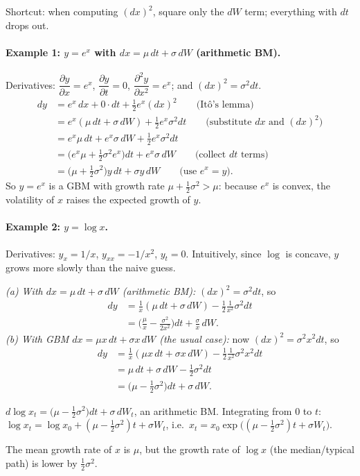 \begin{tipbox}
Shortcut: when computing $(dx)^2$, square only the $dW$ term; everything with $dt$ drops out.
\end{tipbox}

\paragraph{Example 1: $y=e^x$ with $dx=\mu\,dt+\sigma\,dW$ (arithmetic BM).}
Derivatives: $\dfrac{\partial y}{\partial x}=e^x$, $\dfrac{\partial y}{\partial t}=0$, $\dfrac{\partial^2y}{\partial x^2}=e^x$; and $(dx)^2=\sigma^2dt$.
\begin{align*}
dy&=e^x\,dx+0\cdot dt+\tfrac12e^x(dx)^2\qquad\text{(It\^o's lemma)}\\
&=e^x(\mu\,dt+\sigma\,dW)+\tfrac12e^x\sigma^2dt\qquad\text{(substitute $dx$ and $(dx)^2$)}\\
&=e^x\mu\,dt+e^x\sigma\,dW+\tfrac12e^x\sigma^2dt\\
&=\Big(e^x\mu+\tfrac12\sigma^2e^x\Big)dt+e^x\sigma\,dW\qquad\text{(collect $dt$ terms)}\\
&=\Big(\mu+\tfrac12\sigma^2\Big)y\,dt+\sigma y\,dW\qquad\text{(use $e^x=y$)}.
\end{align*}
So $y=e^x$ is a GBM with growth rate $\mu+\tfrac12\sigma^2>\mu$: because $e^x$ is convex, the volatility of $x$ raises the expected growth of $y$.

\paragraph{Example 2: $y=\log x$.} Derivatives: $y_x=1/x$, $y_{xx}=-1/x^2$, $y_t=0$. Intuitively, since $\log$ is concave, $y$ grows more slowly than the naive guess.

\emph{(a) With $dx=\mu\,dt+\sigma\,dW$ (arithmetic BM):} $(dx)^2=\sigma^2dt$, so
\begin{align*}
dy&=\frac1x(\mu\,dt+\sigma\,dW)-\frac12\frac{1}{x^2}\sigma^2dt\\
&=\Big(\frac{\mu}{x}-\frac{\sigma^2}{2x^2}\Big)dt+\frac{\sigma}{x}\,dW.
\end{align*}
\emph{(b) With GBM $dx=\mu x\,dt+\sigma x\,dW$ (the usual case):} now $(dx)^2=\sigma^2x^2dt$, so
\begin{align*}
dy&=\frac1x(\mu x\,dt+\sigma x\,dW)-\frac12\frac{1}{x^2}\sigma^2x^2dt\\
&=\mu\,dt+\sigma\,dW-\tfrac12\sigma^2dt\\
&=\Big(\mu-\tfrac12\sigma^2\Big)dt+\sigma\,dW.
\end{align*}
\begin{keybox}[title=Log of a GBM]
$d\log x_t=\big(\mu-\tfrac12\sigma^2\big)dt+\sigma\,dW_t$, an arithmetic BM. Integrating from $0$ to $t$: $\log x_t=\log x_0+(\mu-\tfrac12\sigma^2)t+\sigma W_t$, i.e.\ $x_t=x_0\exp\!\big((\mu-\tfrac12\sigma^2)t+\sigma W_t\big)$.
\end{keybox}
The mean growth rate of $x$ is $\mu$, but the growth rate of $\log x$ (the median/typical path) is lower by $\tfrac12\sigma^2$.

